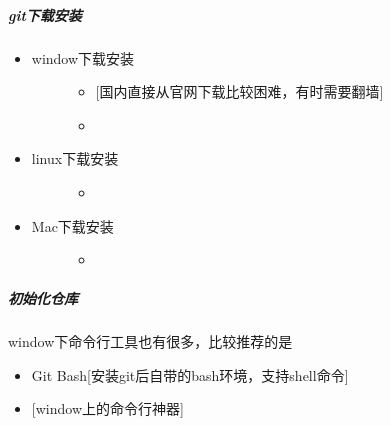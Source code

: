 \documentclass[a4paper,10pt,english]{sphinxmanual}
\begin{document}
\subparagraph{git下载安装}
\label{\detokenize{sphinx/2-collocation/1-github/1-InitLocal:git}}\begin{itemize}
\item {} \begin{description}
\item[{window下载安装}] \leavevmode\begin{itemize}
\item {} 
 {[}国内直接从官网下载比较困难，有时需要翻墙{]}

\item {} 

\end{itemize}

\end{description}

\item {} \begin{description}
\item[{linux下载安装}] \leavevmode\begin{itemize}
\item {} 

\end{itemize}

\end{description}

\item {} \begin{description}
\item[{Mac下载安装}] \leavevmode\begin{itemize}
\item {} 

\end{itemize}

\end{description}

\end{itemize}


\subparagraph{初始化仓库}
\label{\detokenize{sphinx/2-collocation/1-github/1-InitLocal:id7}}
window下命令行工具也有很多，比较推荐的是
\begin{itemize}
\item {} 
Git Bash{[}安装git后自带的bash环境，支持shell命令{]}

\item {} 
 {[}window上的命令行神器{]}

\end{itemize}
\end{document}
